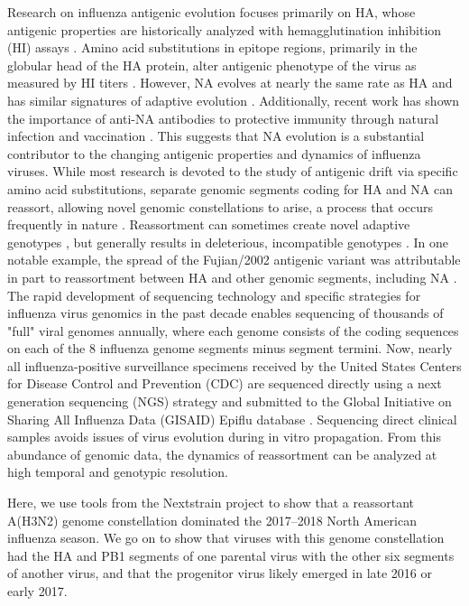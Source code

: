 Research on influenza antigenic evolution focuses primarily on HA, whose antigenic properties are historically analyzed with hemagglutination inhibition (HI) assays \citep{hirst_quantitative_1942}.
Amino acid substitutions in epitope regions, primarily in the globular head of the HA protein, alter antigenic phenotype of the virus as measured by HI titers \citep{smith_mapping_2004, koel_substitutions_2013, bedford_integrating_2014, neher_prediction_2016}.
However, NA evolves at nearly the same rate as HA and has similar signatures of adaptive evolution \citep{bhatt_genomic_2011}.
Additionally, recent work has shown the importance of anti-NA antibodies to protective immunity through natural infection and vaccination \citep{monto_antibody_2015, huang_risk_2018}.
This suggests that NA evolution is a substantial contributor to the changing antigenic properties and dynamics of influenza viruses.
While most research is devoted to the study of antigenic drift via specific amino acid substitutions, separate genomic segments coding for HA and NA can reassort, allowing novel genomic constellations to arise, a process that occurs frequently in nature \citep{nelson_multiple_2008, marshall_influenza_2013}.
Reassortment can sometimes create novel adaptive genotypes \citep{neverov_intrasubtype_2014, dudas_reassortment_2015}, but generally results in deleterious, incompatible genotypes \citep{rabadan_non-random_2008, villa_fitness_2017}.
In one notable example, the spread of the Fujian/2002 antigenic variant was attributable in part to reassortment between HA and other genomic segments, including NA \citep{holmes_whole_2005}.
The rapid development of sequencing technology and specific strategies for influenza virus genomics in the past decade enables sequencing of thousands of "full" viral genomes annually, where each genome consists of the coding sequences on each of the 8 influenza genome segments minus segment termini.
Now, nearly all influenza-positive surveillance specimens received by the United States Centers for Disease Control and Prevention (CDC) are sequenced directly using a next generation sequencing (NGS) strategy and submitted to the Global Initiative on Sharing All Influenza Data (GISAID) Epiflu database \citep{elbe2017data}.
Sequencing direct clinical samples avoids issues of virus evolution during in vitro propagation.
From this abundance of genomic data, the dynamics of reassortment can be analyzed at high temporal and genotypic resolution.

Here, we use tools from the Nextstrain project \citep{hadfield_nextstrain_2018} to show that a reassortant A(H3N2) genome constellation dominated the 2017--2018 North American influenza season.
We go on to show that viruses with this genome constellation had the HA and PB1 segments of one parental virus with the other six segments of another virus, and that the progenitor virus likely emerged in late 2016 or early 2017.

